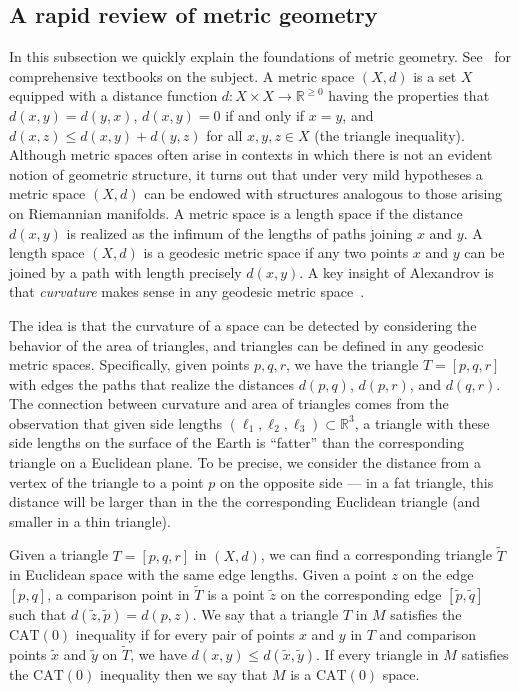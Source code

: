 \documentclass[a4paper,11pt]{article}
\newcommand{\CAT}{\textrm{CAT}}
\begin{document}
\subsection{A rapid review of metric geometry}

In this subsection we quickly explain the foundations of metric
geometry.  See~\cite{bridson99, burago01} for comprehensive textbooks
on the subject.  A metric space $(X,d)$ is a set $X$ equipped with a
distance function $d \colon X \times X \to \mathbb{R}^{\geq 0}$ having
the properties that $d(x,y) = d(y,x)$, $d(x,y) = 0$ if and only if $x
= y$, and $d(x,z) \leq d(x,y) + d(y,z)$ for all $x,y,z \in X$ (the
triangle inequality).  Although metric spaces often arise in contexts
in which there is not an evident notion of geometric structure, it
turns out that under very mild hypotheses a metric space $(X,d)$ can
be endowed with structures analogous to those arising on Riemannian
manifolds.  A metric space is a length space if the distance $d(x,y)$
is realized as the infimum of the lengths of paths joining $x$ and
$y$.  A length space $(X,d)$ is a geodesic metric space if any two
points $x$ and $y$ can be joined by a path with length precisely
$d(x,y)$.  A key insight of Alexandrov is that {\em curvature} makes
sense in any geodesic metric space~\cite{alexandrov1957uber}.

The idea is that the curvature of a space can be detected by considering the behavior of the area of triangles, and triangles can be defined in any geodesic metric spaces.
Specifically, given points $p, q, r$, we have the triangle $T = [p,q,r]$ with edges the paths that realize the distances $d(p,q)$, $d(p,r)$, and $d(q,r)$.
The connection between curvature and area of triangles comes from the observation that given side lengths $(\ell_1, \ell_2, \ell_3) \subset \mathbb{R}^3$, a triangle with these side lengths on the surface of the Earth is ``fatter'' than the corresponding triangle on a Euclidean plane.
To be precise, we consider the distance from a vertex of the triangle to a point $p$ on the opposite side --- in a fat triangle, this distance will be larger than in the the corresponding Euclidean triangle (and smaller in a thin triangle).

Given a triangle $T=[p,q,r]$ in $(X,d)$, we can find a corresponding triangle $\tilde{T}$ in Euclidean space with the same edge lengths.
Given a point $z$ on the edge $[p,q]$, a comparison point in $\tilde{T}$ is a point $\tilde{z}$ on the corresponding edge $[\tilde{p}, \tilde{q}]$ such that $d(\tilde{z}, \tilde{p}) = d(p,z)$.
We say that a triangle $T$ in $M$ satisfies the $\CAT(0)$ inequality if for every pair of points $x$ and $y$ in $T$ and comparison points $\tilde{x}$ and $\tilde{y}$ on $\tilde{T}$, we have $d(x,y) \leq d(\tilde{x}, \tilde{y})$.
If every triangle in $M$ satisfies the $\CAT(0)$ inequality then we say that $M$ is a $\CAT(0)$ space.
\end{document}
